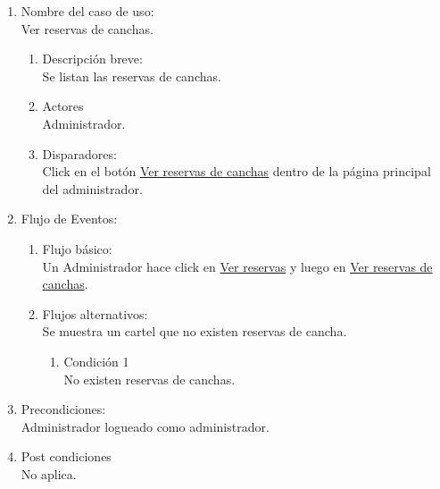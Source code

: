 \documentclass[a4paper,11pt]{article}
\begin{document}
\begin{enumerate}

    \item Nombre del caso de uso: \\
    Ver reservas de canchas.

    \begin{enumerate}
    \item Descripción breve: \\
        Se listan las reservas de canchas.
    \item Actores \\
        Administrador.
    \item Disparadores: \\
        Click en el botón \underline{Ver reservas de canchas}
        dentro de la página principal del administrador.
    \end{enumerate}

    \item Flujo de Eventos: \\

    \begin{enumerate}

        \item Flujo básico:\\
            Un Administrador hace click en \underline{Ver reservas} y luego
            en \underline{Ver reservas de canchas}.
        \item Flujos alternativos:\\
            Se muestra un cartel que no existen reservas de cancha.
            \begin{enumerate}
                \item Condición 1 \\
                    No existen reservas de canchas.
            \end{enumerate}

    \end{enumerate}

    \item Precondiciones: \\
        Administrador logueado como administrador.

    \item Post condiciones \\
        No aplica.

\end{enumerate}
\end{document}
